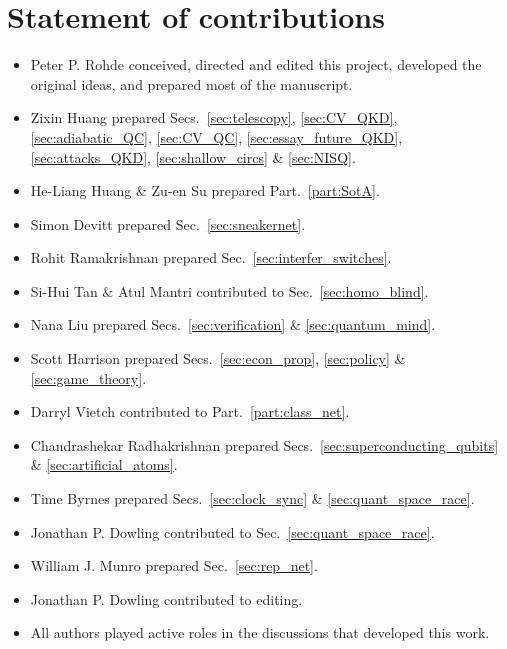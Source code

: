 %
%

\section*{Statement of contributions}

\begin{itemize}
	\item Peter P. Rohde conceived, directed and edited this project, developed the original ideas, and prepared most of the manuscript.
	\item Zixin Huang prepared Secs.~\ref{sec:telescopy}, \ref{sec:CV_QKD}, \ref{sec:adiabatic_QC}, \ref{sec:CV_QC}, \ref{sec:essay_future_QKD}, \ref{sec:attacks_QKD}, \ref{sec:shallow_circs} \& \ref{sec:NISQ}.
	\item He-Liang Huang \& Zu-en Su prepared Part.~\ref{part:SotA}.
	\item Simon Devitt prepared Sec.~\ref{sec:sneakernet}.
	\item Rohit Ramakrishnan prepared Sec.~\ref{sec:interfer_switches}.
	\item Si-Hui Tan \& Atul Mantri contributed to Sec.~\ref{sec:homo_blind}.
	\item Nana Liu prepared Secs.~\ref{sec:verification} \& \ref{sec:quantum_mind}.
	\item Scott Harrison prepared Secs.~\ref{sec:econ_prop}, \ref{sec:policy} \& \ref{sec:game_theory}.
	\item Darryl Vietch contributed to Part.~\ref{part:class_net}.
	\item Chandrashekar Radhakrishnan prepared Secs.~\ref{sec:superconducting_qubits} \& \ref{sec:artificial_atoms}.
	\item Time Byrnes prepared Secs.~\ref{sec:clock_sync} \& \ref{sec:quant_space_race}.
	\item Jonathan P. Dowling contributed to Sec.~\ref{sec:quant_space_race}.
	\item William J. Munro prepared Sec.~\ref{sec:rep_net}. 
	\item Jonathan P. Dowling contributed to editing.
	\item All authors played active roles in the discussions that developed this work. 
\end{itemize}